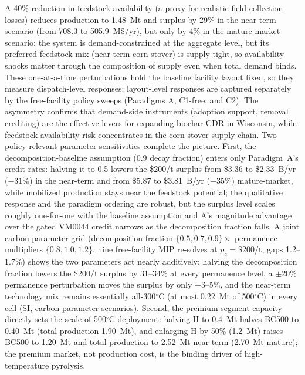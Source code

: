 A
40\% reduction in feedstock availability (a proxy for realistic
field-collection losses) reduces production to 1.48~Mt and surplus by 29\% in
the near-term scenario (from 708.3 to 505.9~M\$/yr), but only by 4\% in the
mature-market scenario: the
system is demand-constrained at the aggregate level, but its preferred
feedstock mix (near-term corn stover) is supply-tight, so availability shocks
matter through the composition of supply even when total demand binds.
These one-at-a-time perturbations hold the baseline facility layout
fixed, so they measure dispatch-level responses; layout-level responses are
captured separately by the free-facility policy sweeps (Paradigms A, C1-free,
and C2). The asymmetry confirms that demand-side instruments (adoption support,
removal crediting) are the effective levers for expanding biochar CDR in
Wisconsin, while feedstock-availability risk concentrates in the corn-stover
supply chain. Two policy-relevant parameter sensitivities complete the
picture. First, the decomposition-baseline assumption (0.9 decay fraction)
enters only Paradigm~A's credit rates: halving it to 0.5 lowers the
\$200/t surplus from \$3.36 to \$2.33~B/yr ($-31$\%) in the near-term and from
\$5.87 to \$3.81~B/yr ($-35$\%) mature-market, while mobilized production stays
near the feedstock potential; the qualitative response and the paradigm
ordering are robust, but the surplus level scales roughly one-for-one with the
baseline assumption and A's magnitude advantage over the gated VM0044 credit
narrows as the decomposition fraction falls. A joint carbon-parameter grid
(decomposition fraction $\{0.5,0.7,0.9\}\times$ permanence multipliers
$\{0.8,1.0,1.2\}$, nine free-facility MIP re-solves at $p_c=\$200$/t, gaps
1.2--1.7\%) shows the two parameters act nearly additively: halving the
decomposition fraction lowers the \$200/t surplus by 31--34\% at every
permanence level, a $\pm$20\% permanence perturbation moves the surplus by
only $\mp$3--5\%, and the near-term technology mix remains essentially
all-300$^\circ$C (at most 0.22~Mt of 500$^\circ$C) in every cell (SI,
carbon-parameter scenarios). Second,
the premium-segment capacity directly sets the scale of 500$^\circ$C
deployment: halving H to 0.4~Mt halves BC500 to 0.40~Mt (total production
1.90~Mt), and enlarging H by 50\% (1.2~Mt) raises BC500 to 1.20~Mt and total
production to 2.52~Mt near-term (2.70~Mt mature); the premium market, not
production cost, is the binding driver of high-temperature pyrolysis.
